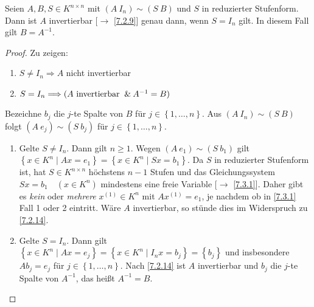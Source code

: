 \documentclass[../../main.tex]{subfiles}
\begin{document}
\begin{sat}\label{7.3.5}
Seien $A,B,S\in K^{n\times n}$ mit $(A~I_n)\sim (S~B)$ und $S$ in reduzierter Stufenform. Dann ist $A$ invertierbar {\rm[$\to$ \ref{7.2.9}]} genau dann, wenn $S = I_n$ gilt. In diesem Fall gilt $B = A^{-1}$.
\end{sat}
\begin{proof}
Zu zeigen:
\begin{enumerate}[\normalfont(a)]
\item $S \ne I_n \Longrightarrow A$ nicht invertierbar
\item $S = I_n \Longrightarrow (A \text{ invertierbar }\mathbin{\&} A^{-1}=B)$
\end{enumerate}
Bezeichne $b_j$ die $j$-te Spalte von $B$ für $j\in \left\{1,\ldots,n\right\}$. Aus $(A~I_n)\sim(S~B)$ folgt $(A~e_j) \sim (S~b_j)$ für $j\in \left\{1,\ldots,n\right\}$.
\begin{enumerate}[Zu (a).]
\item Gelte $S\ne I_n$. Dann gilt $n\ge 1$. Wegen $(A~e_1)\sim (S~b_1)$ gilt $\left\{x\in K^n\mid Ax = e_1\right\} = \left\{x\in K^n\mid Sx = b_1\right\}$. Da $S$ in reduzierter Stufenform ist, hat $S\in K^{n\times n}$ höchstens $n-1$ Stufen und das Gleichungssystem $Sx = b_1 \quad (x\in K^n)$ mindestens eine freie Variable [$\to$ \ref{7.3.1}]. Daher gibt es \emph{kein} oder \emph{mehrere} $x^{(1)}\in K^n$ mit $Ax^{(1)} = e_1$, je nachdem ob in \ref{7.3.1} Fall 1 oder 2 eintritt. Wäre $A$ invertierbar, so stünde dies im Widerspruch zu \ref{7.2.14}.
\item Gelte $S = I_n$. Dann gilt $\left\{x\in K^n\mid Ax = e_j\right\} = \left\{x\in K^n\mid I_nx = b_j\right\} = \left\{b_j\right\}$ und insbesondere $Ab_j = e_j$ für $j\in \left\{1,\ldots,n\right\}$. Nach \ref{7.2.14} ist $A$ invertierbar und $b_j$ die $j$-te Spalte von $A^{-1}$, das heißt $A^{-1} = B$.
\end{enumerate}
\end{proof}
\end{document}
